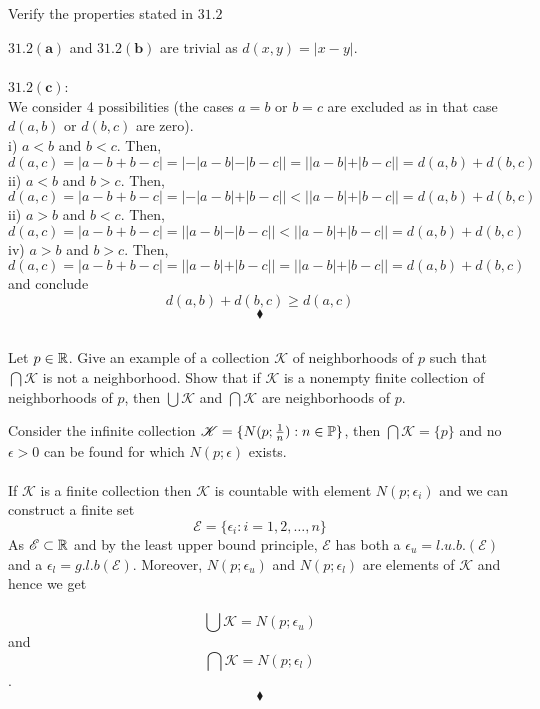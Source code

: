 
\renewcommand{\thesubsection}{\thesection.\arabic{subsection}}
\setcounter{subsection}{0}
\subsection{}
\begin{tcolorbox}
Verify the properties stated in $\mathbf{31.2}$
\end{tcolorbox}
$\mathbf{31.2(a)}$ and $\mathbf{31.2(b)}$ are trivial as $d(x,y)=|x-y|$.\\\\
$\mathbf{31.2(c)}$:\\
We consider 4 possibilities (the cases $a=b$ or $b=c$ are excluded as in that case $d(a,b)$ or $d(b,c)$ are zero).\\
i) $a<b$ and $b<c$. Then, 
$$d(a,c)= |a-b+b-c| = |-|a-b|-|b-c||= | |a-b|+|b-c| |= d(a,b)+d(b,c)$$
ii) $a<b$ and $b>c$. Then, 
$$d(a,c)= |a-b+b-c| = |-|a-b|+|b-c||< | |a-b|+|b-c| |= d(a,b)+d(b,c)$$
ii) $a>b$ and $b<c$. Then, 
$$d(a,c)= |a-b+b-c| = ||a-b|-|b-c||< | |a-b|+|b-c| |= d(a,b)+d(b,c)$$
iv) $a>b$ and $b>c$. Then, 
$$d(a,c)= |a-b+b-c| = ||a-b|+|b-c||= | |a-b|+|b-c| |= d(a,b)+d(b,c)$$
and conclude $$d(a,b)+d(b,c) \geq d(a,c)$$
$$\blacklozenge$$

\subsection{}
\begin{tcolorbox}
Let $p\in\mathbb{R}$. Give an example of a collection $\mathscr{K}$ of neighborhoods of $p$ such that $\bigcap\mathscr{K}$ is not a neighborhood. Show that if $\mathscr{K}$ is a nonempty finite collection of neighborhoods of $p$, then $\bigcup\mathscr{K}$ and $\bigcap\mathscr{K}$ are neighborhoods of $p$.
\end{tcolorbox}
Consider the infinite collection $\mathscr{K}=\{N(p;\frac{1}{n}):n\in \mathbb{P}\}$, then $\bigcap\mathscr{K}=\{p\}$ and no $\epsilon>0$ can be found for which $N(p;\epsilon)$ exists. \\\\
If $\mathscr{K}$ is a finite collection then $\mathscr{K}$ is countable with element $N(p;\epsilon_i)$ and we can construct a finite set $$\mathscr{E}=\{\epsilon_i:i=1,2,\dots,n\}$$  As $ \mathscr{E}\subset \mathbb{R}$ and by the least upper bound principle, $\mathscr{E}$ has both a $\epsilon_u= l.u.b.(\mathscr{E})$ and a $\epsilon_l = g.l.b(\mathscr{E})$. Moreover, $N(p;\epsilon_u)$ and  $N(p;\epsilon_l)$ are elements of $\mathscr{K}$ and hence we get\\\\
$$\bigcup\mathscr{K}=N(p;\epsilon_u)$$ and $$\bigcap\mathscr{K}=N(p;\epsilon_l)$$.
$$\blacklozenge$$
\newpage


